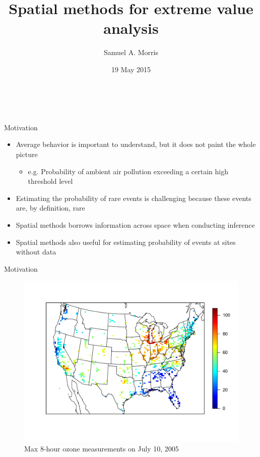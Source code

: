 \documentclass{beamer}
\title[Spatial methods for EVA] %
{
  Spatial methods for extreme value analysis
}
\author[S. Morris]{Samuel A. Morris}
\institute[]{North Carolina State University}
\date[]{19 May 2015}
\begin{document}
\begin{frame}\frametitle{\ }
\begin{center}
  \maketitle
\end{center}
\end{frame}

\begin{frame}{Motivation}
  \begin{itemize} \setlength{\itemsep}{1em}
    \item Average behavior is important to understand, but it does not paint the whole picture
    \begin{itemize}
      \item e.g. Probability of ambient air pollution exceeding a certain high threshold level
    \end{itemize}
    \item Estimating the probability of rare events is challenging because these events are, by definition, rare
    \item Spatial methods borrows information across space when conducting inference
    \item Spatial methods also useful for estimating probability of events at sites without data
  \end{itemize}
\end{frame}

\begin{frame}{Motivation}
  \centering
  \begin{figure}
    \includegraphics[width=\linewidth, trim=0 1in 0 1in ]{./plots/pot/ozone-10jul-us.pdf}
    \caption{Max 8-hour ozone measurements on July 10, 2005}
   \end{figure}
\end{frame}
\end{document}
